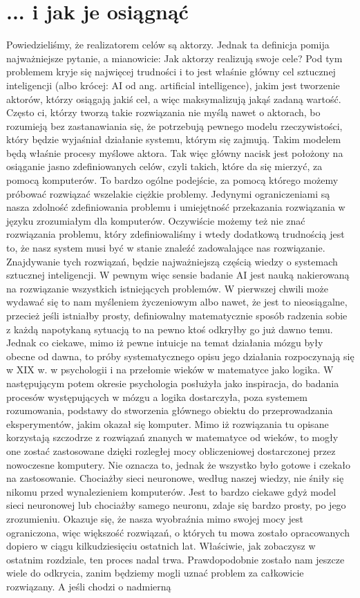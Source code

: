 \section{... i jak je osiągnąć}

Powiedzieliśmy, że realizatorem celów są aktorzy. Jednak ta definicja pomija najważniejsze pytanie, a mianowicie: Jak aktorzy realizują swoje cele? Pod tym problemem kryje się najwięcej trudności i to jest właśnie główny cel sztucznej inteligencji (albo krócej: AI od ang. artificial intelligence), jakim jest tworzenie aktorów, którzy osiągają jakiś cel, a więc maksymalizują jakąś zadaną wartość. Często ci, którzy tworzą takie rozwiązania nie myślą nawet o aktorach, bo rozumieją bez zastanawiania się, że potrzebują pewnego modelu rzeczywistości, który będzie wyjaśniał działanie systemu, którym się zajmują. Takim modelem będą właśnie procesy myślowe aktora. Tak więc główny nacisk jest położony na osiąganie jasno zdefiniowanych celów, czyli takich, które da się mierzyć, za pomocą komputerów. To bardzo ogólne podejście, za pomocą którego możemy próbować rozwiązać wszelakie ciężkie problemy. Jedynymi ograniczeniami są nasza zdolność zdefiniowania problemu i umiejętność przekazania rozwiązania w języku zrozumiałym dla komputerów. Oczywiście możemy też nie znać rozwiązania problemu, który zdefiniowaliśmy i wtedy dodatkową trudnością jest to, że nasz system musi być w stanie znaleźć zadowalające nas rozwiązanie. Znajdywanie tych rozwiązań, będzie najważniejszą częścią wiedzy o systemach sztucznej inteligencji. W pewnym więc sensie badanie AI jest nauką nakierowaną na rozwiązanie wszystkich istniejących problemów. W pierwszej chwili może wydawać się to nam myśleniem życzeniowym albo nawet, że jest to nieosiągalne, przecież jeśli istniałby prosty, definiowalny matematycznie sposób radzenia sobie z każdą napotykaną sytuacją to na pewno ktoś odkryłby go już dawno temu. Jednak co ciekawe, mimo iż pewne intuicje na temat działania mózgu były obecne od dawna, to próby systematycznego opisu jego działania rozpoczynają się w XIX w. w psychologii i na przełomie wieków w matematyce jako logika. W następującym potem okresie psychologia posłużyła jako inspiracja, do badania procesów występujących w mózgu a logika dostarczyła, poza systemem rozumowania, podstawy do stworzenia głównego obiektu do przeprowadzania eksperymentów, jakim okazał się komputer. Mimo iż rozwiązania tu opisane korzystają szczodrze z rozwiązań znanych w matematyce od wieków, to mogły one zostać zastosowane dzięki rozległej mocy obliczeniowej dostarczonej przez nowoczesne komputery. Nie oznacza to, jednak że wszystko było gotowe i czekało na zastosowanie. Chociażby sieci neuronowe, według naszej wiedzy, nie śniły się nikomu przed wynalezieniem komputerów. Jest to bardzo ciekawe gdyż model sieci neuronowej lub chociażby samego neuronu, zdaje się bardzo prosty, po jego zrozumieniu. Okazuje się, że nasza wyobraźnia mimo swojej mocy jest ograniczona, więc większość rozwiązań, o których tu mowa zostało opracowanych dopiero w ciągu kilkudziesięciu ostatnich lat. Właściwie, jak zobaczysz w ostatnim rozdziale, ten proces nadal trwa. Prawdopodobnie zostało nam jeszcze wiele do odkrycia, zanim będziemy mogli uznać problem za całkowicie rozwiązany. A jeśli chodzi o nadmierną 